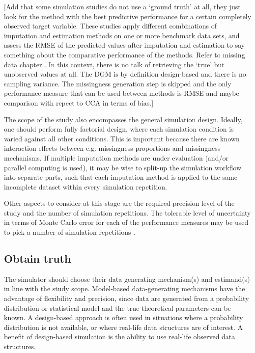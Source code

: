 \documentclass[bimj,fleqn]{w-art}
\begin{document}
[Add that some simulation studies do not use a `ground truth' at all, they just look for the method with the best predictive performance for a certain completely observed target variable. These studies apply different combinations of imputation and estimation methods on one or more benchmark data sets, and assess the RMSE of the predicted values after imputation and estimation to say something about the comparative performance of the methods. Refer to missing data chapter \citep{liu21}. In this context, there is no talk of retrieving the `true' but unobserved values at all. The DGM is by definition design-based and there is no sampling variance. The missingness generation step is skipped and the only performance measure that can be used between methods is RMSE and maybe comparison with repect to CCA in terms of bias.]

The scope of the study also encompasses the general simulation design. Ideally, one should perform fully factorial design, where each simulation condition is varied against all other conditions. This is important because there are known interaction effects between e.g. missingness proportions and missingness mechanisms. If multiple imputation methods are under evaluation (and/or parallel computing is used), it may be wise to split-up the simulation workflow into separate parts, such that each imputation method is applied to the same incomplete dataset within every simulation repetition.

Other aspects to consider at this stage are the required precision level of the study and the number of simulation repetitions. The tolerable level of uncertainty in terms of Monte Carlo error for each of the performance measures may be used to pick a number of simulation repetitions \citep[see e.g.][]{morr18}. 



\subsection{Obtain truth}


The simulator should choose their data generating mechanism(s) and estimand(s) in line with the study scope. Model-based data-generating mechanisms have the advantage of flexibility and precision, since data are generated from a probability distribution or statistical model and the true theoretical parameters can be known. A design-based approach is often used in situations where a probability distribution is not available, or where real-life data structures are of interest. A benefit of design-based simulation is the ability to use real-life observed data structures. 
\end{document}
